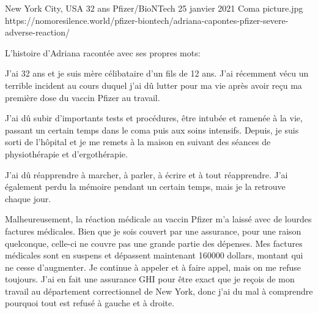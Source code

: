 {New York City, USA}
{32 ans}
{Pfizer/BioNTech}
{25 janvier 2021}
{Coma}
{picture.jpg}
{https://nomoresilence.world/pfizer-biontech/adriana-capontes-pfizer-severe-adverse-reaction/}
{

L'histoire d'Adriana racontée avec ses propres mots:

J'ai 32 ans et je suis mère célibataire d'un fils de 12 ans. J'ai récemment vécu
un terrible incident au cours duquel j'ai dû lutter pour ma vie après avoir reçu
ma première dose du vaccin Pfizer au travail.

J'ai dû subir d'importants tests et procédures, être intubée et ramenée à la
vie, passant un certain temps dans le coma puis aux soins intensifs. Depuis, je
suis sorti de l'hôpital et je me remets à la maison en suivant des séances de
physiothérapie et d'ergothérapie.

J'ai dû réapprendre à marcher, à parler, à écrire et à tout réapprendre. J'ai
également perdu la mémoire pendant un certain temps, mais je la retrouve chaque
jour.

Malheureusement, la réaction médicale au vaccin Pfizer m'a laissé avec de
lourdes factures médicales. Bien que je sois couvert par une assurance, pour une
raison quelconque, celle-ci ne couvre pas une grande partie des dépenses. Mes
factures médicales sont en suspens et dépassent maintenant 160000 dollars,
montant qui ne cesse d'augmenter. Je continue à appeler et à faire appel, mais
on me refuse toujours. J'ai en fait une assurance GHI pour être exact que je
reçois de mon travail au département correctionnel de New York, donc j'ai du mal
à comprendre pourquoi tout est refusé à gauche et à droite.

}
